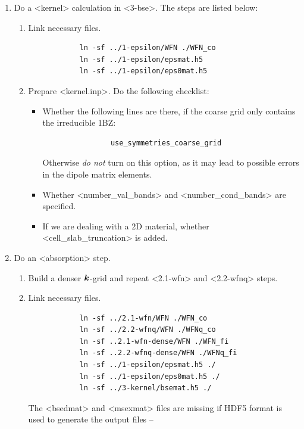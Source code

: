 \documentclass[hyperref, a4paper, 12pt]{report}
\def\texttt#1{<#1>}%
\newcommand{\shortcode}[1]{\texttt{#1}}
\begin{document}
\begin{enumerate}
    \item Do a \shortcode{kernel} calculation in \shortcode{3-bse}. The steps are listed below:
    \begin{enumerate}
        \item Link necessary files.
        \begin{lstlisting}
            ln -sf ../1-epsilon/WFN ./WFN_co
            ln -sf ../1-epsilon/epsmat.h5 
            ln -sf ../1-epsilon/eps0mat.h5     
        \end{lstlisting}
        \item Prepare \shortcode{kernel.inp}. Do the following checklist:
        \begin{itemize}
            \item Whether the following lines are there, if the coarse grid only contains the irreducible 1BZ:
            \begin{lstlisting}
                use_symmetries_coarse_grid
            \end{lstlisting}
            Otherwise \emph{do not} turn on this option, as it may lead to possible errors in the dipole matrix elements.
            \item Whether \shortcode{number_val_bands} and \shortcode{number_cond_bands}
            are specified.
            \item If we are dealing with a 2D material,
            whether \shortcode{cell_slab_truncation} is added.
        \end{itemize}
    \end{enumerate}
    \item Do an \shortcode{absorption} step. 
    \begin{enumerate}
        \item Build a denser $\vb*{k}$-grid 
        and repeat \shortcode{2.1-wfn} and \shortcode{2.2-wfnq} steps.
        \item Link necessary files.
        \begin{lstlisting}
            ln -sf ../2.1-wfn/WFN ./WFN_co
            ln -sf ../2.2-wfnq/WFN ./WFNq_co
            ln -sf ..2.1-wfn-dense/WFN ./WFN_fi
            ln -sf ..2.2-wfnq-dense/WFN ./WFNq_fi
            ln -sf ../1-epsilon/epsmat.h5 ./
            ln -sf ../1-epsilon/eps0mat.h5 ./
            ln -sf ../3-kernel/bsemat.h5 ./ 
        \end{lstlisting}
        The \shortcode{bsedmat} and \shortcode{msexmat} files are missing 
        if HDF5 format is used to generate the output files -- 

\end{enumerate}
\end{enumerate}
\end{document}
